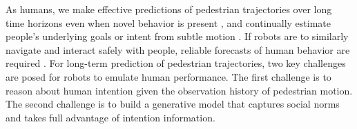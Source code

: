 As humans, we make effective predictions of pedestrian trajectories over long time horizons even when novel behavior is present \cite[]{diidha}, and continually estimate people’s underlying goals or intent from subtle motion \cite[]{doi:10.1146/annurev.psych.57.102904.190152}. If robots are to similarly navigate and interact safely with people, reliable forecasts of human behavior are required \cite[]{DBLP:journals/corr/abs-1905-06113}. For long-term prediction of pedestrian trajectories, two key challenges are posed for robots to emulate human performance. The first challenge is to reason about human intention given the observation history of pedestrian motion. The second challenge is to build a generative model that captures social norms and takes full advantage of intention information.